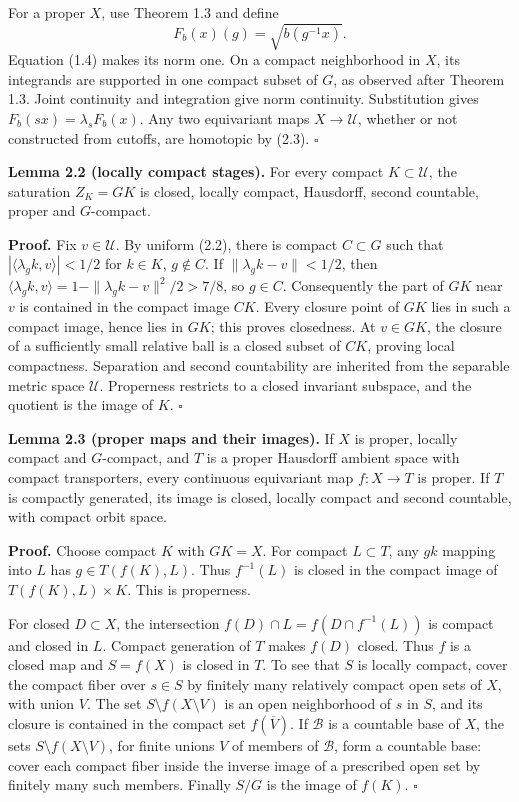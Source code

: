 \documentclass[
  11pt,
]{article}
\begin{document}
For a proper \(X\), use Theorem 1.3 and define \[
                    F_b(x)(g)=\sqrt{b(g^{-1}x)}.
 \tag{2.4}
\] Equation (1.4) makes its norm one. On a compact neighborhood in
\(X\), its integrands are supported in one compact subset of \(G\), as
observed after Theorem 1.3. Joint continuity and integration give norm
continuity. Substitution gives \(F_b(sx)=\lambda_sF_b(x)\). Any two
equivariant maps \(X\to\mathcal U\), whether or not constructed from
cutoffs, are homotopic by (2.3). \(\square\)

\textbf{Lemma 2.2 (locally compact stages).} For every compact
\(K\subset\mathcal U\), the saturation \(Z_K=GK\) is closed, locally
compact, Hausdorff, second countable, proper and \(G\)-compact.

\textbf{Proof.} Fix \(v\in\mathcal U\). By uniform (2.2), there is
compact \(C\subset G\) such that \(|\langle\lambda_gk,v\rangle|<1/2\)
for \(k\in K\), \(g\notin C\). If \(\|\lambda_gk-v\|<1/2\), then
\(\langle\lambda_gk,v\rangle=1-\|\lambda_gk-v\|^2/2>7/8\), so
\(g\in C\). Consequently the part of \(GK\) near \(v\) is contained in
the compact image \(CK\). Every closure point of \(GK\) lies in such a
compact image, hence lies in \(GK\); this proves closedness. At
\(v\in GK\), the closure of a sufficiently small relative ball is a
closed subset of \(CK\), proving local compactness. Separation and
second countability are inherited from the separable metric space
\(\mathcal U\). Properness restricts to a closed invariant subspace, and
the quotient is the image of \(K\). \(\square\)

\textbf{Lemma 2.3 (proper maps and their images).} If \(X\) is proper,
locally compact and \(G\)-compact, and \(T\) is a proper Hausdorff
ambient space with compact transporters, every continuous equivariant
map \(f:X\to T\) is proper. If \(T\) is compactly generated, its image
is closed, locally compact and second countable, with compact orbit
space.

\textbf{Proof.} Choose compact \(K\) with \(GK=X\). For compact
\(L\subset T\), any \(gk\) mapping into \(L\) has \(g\in T(f(K),L)\).
Thus \(f^{-1}(L)\) is closed in the compact image of
\(T(f(K),L)\times K\). This is properness.

For closed \(D\subset X\), the intersection
\(f(D)\cap L=f(D\cap f^{-1}(L))\) is compact and closed in \(L\).
Compact generation of \(T\) makes \(f(D)\) closed. Thus \(f\) is a
closed map and \(S=f(X)\) is closed in \(T\). To see that \(S\) is
locally compact, cover the compact fiber over \(s\in S\) by finitely
many relatively compact open sets of \(X\), with union \(V\). The set
\(S\setminus f(X\setminus V)\) is an open neighborhood of \(s\) in
\(S\), and its closure is contained in the compact set
\(f(\overline V)\). If \(\mathcal B\) is a countable base of \(X\), the
sets \(S\setminus f(X\setminus V)\), for finite unions \(V\) of members
of \(\mathcal B\), form a countable base: cover each compact fiber
inside the inverse image of a prescribed open set by finitely many such
members. Finally \(S/G\) is the image of \(f(K)\). \(\square\)
\end{document}
